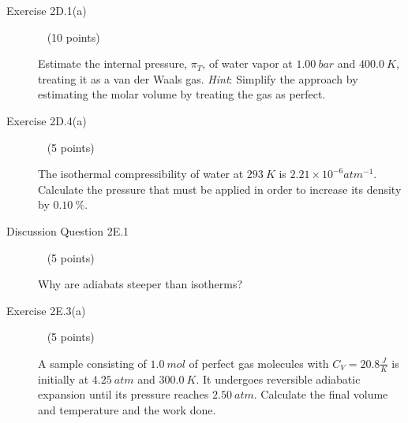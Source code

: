\documentclass[12pt, openany, letterpaper]{memoir}
\begin{document}
\begin{description}
	      \vspace{20em}
	\item [Exercise 2D.1(a)] ~ (10 points)

	      Estimate the internal pressure, $\pi_T$, of water vapor at $1.00~bar$ and $400.0~K$, treating it as a van der Waals gas. \emph{Hint}: Simplify the approach by estimating the molar volume by treating the gas as perfect.

	      \vspace{20em}
	\item [Exercise 2D.4(a)] ~ (5 points)

	      The isothermal compressibility of water at $293~K$ is $2.21\times10^{-6}atm^{-1}$. Calculate the pressure that must be applied in order to increase its density by $0.10~\%$.

	      \vspace{12em}
	\item [Discussion Question 2E.1] ~ (5 points)

	      Why are adiabats steeper than isotherms?

	      \vspace{10em}
	\item [Exercise 2E.3(a)] ~ (5 points)

	      A sample consisting of $1.0~mol$ of perfect gas molecules with $C_V=20.8\frac{J}{K}$ is initially at $4.25~atm$ and $300.0~K$. It undergoes reversible adiabatic expansion until its pressure reaches $2.50~atm$. Calculate the final volume and temperature and the work done.
\end{description}
\end{document}
